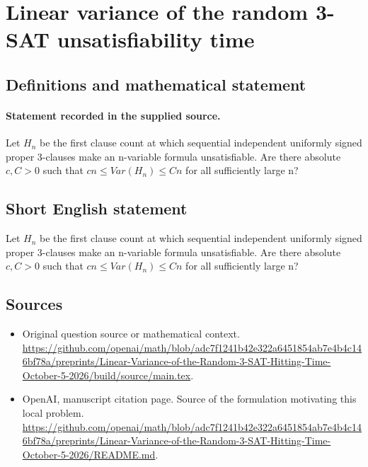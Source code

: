 \documentclass[11pt]{article}
\begin{document}
\section*{Linear variance of the random 3-SAT unsatisfiability time}\label{30007385}
\subsection{Definitions and mathematical statement}
\paragraph{Statement recorded in the supplied source.}
Let $H_n$ be the first clause count at which sequential independent uniformly signed proper 3-clauses make an n-variable formula unsatisfiable. Are there absolute $c,C>0$ such that $cn\leq Var(H_n)\leq Cn$ for all sufficiently large n?
\subsection{Short English statement}
Let $H_n$ be the first clause count at which sequential independent uniformly signed proper 3-clauses make an n-variable formula unsatisfiable. Are there absolute $c,C>0$ such that $cn\leq Var(H_n)\leq Cn$ for all sufficiently large n?
\subsection{Sources}
\begin{itemize}
\item[S1] Original question source or mathematical context.
\url{https://github.com/openai/math/blob/adc7f1241b42e322a6451854ab7e4b4c146bf78a/preprints/Linear-Variance-of-the-Random-3-SAT-Hitting-Time-October-5-2026/build/source/main.tex}.
\item[S2] OpenAI, manuscript citation page. Source of the formulation motivating this local problem.
\url{https://github.com/openai/math/blob/adc7f1241b42e322a6451854ab7e4b4c146bf78a/preprints/Linear-Variance-of-the-Random-3-SAT-Hitting-Time-October-5-2026/README.md}.
\end{itemize}
\end{document}
